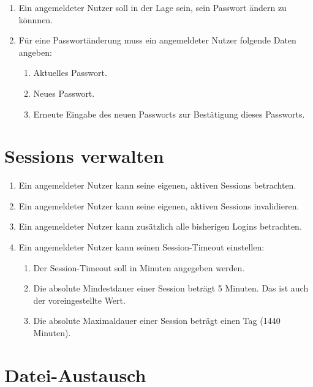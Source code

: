 \documentclass[12pt,DIV14,BCOR10mm,a4paper,parskip=half-,headsepline,headinclude,english,ngerman,bibliography=totocnumbered]{scrreprt}
\begin{document}
\begin{enumerate}
    \item Ein angemeldeter Nutzer soll in der Lage sein, sein Passwort ändern zu könnnen.
    \item Für eine Passwortänderung muss ein angemeldeter Nutzer folgende Daten angeben:
    \begin{enumerate}
        \item Aktuelles Passwort.
        \item Neues Passwort.
        \item Erneute Eingabe des neuen Passworts zur Bestätigung dieses Passworts.
    \end{enumerate}
\end{enumerate}

\chapter{Sessions verwalten}

\begin{enumerate}
    \item Ein angemeldeter Nutzer kann seine eigenen, aktiven Sessions betrachten.
    \item Ein angemeldeter Nutzer kann seine eigenen, aktiven Sessions invalidieren.
    \item Ein angemeldeter Nutzer kann zusätzlich alle bisherigen Logins betrachten.
    \item Ein angemeldeter Nutzer kann seinen Session-Timeout einstellen:
    \begin{enumerate}
        \item Der Session-Timeout soll in Minuten angegeben werden.
        \item Die absolute Mindestdauer einer Session beträgt 5 Minuten. Das ist auch der voreingestellte Wert.
        \item Die absolute Maximaldauer einer Session beträgt einen Tag (1440 Minuten).
    \end{enumerate}
\end{enumerate}

\chapter{Datei-Austausch}
\end{document}

